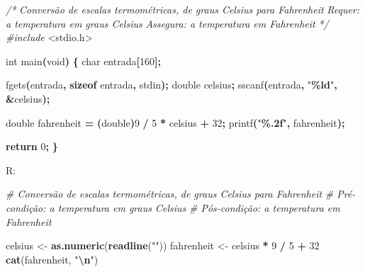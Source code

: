 \documentclass[
  11pt,
  a4paper,
]{scrbook}
\newenvironment{Shaded}{\begin{snugshade}}{\end{snugshade}}
\newcommand{\CommentTok}[1]{\textcolor[rgb]{0.56,0.35,0.01}{\textit{#1}}}
\newcommand{\ControlFlowTok}[1]{\textcolor[rgb]{0.13,0.29,0.53}{\textbf{#1}}}
\newcommand{\DataTypeTok}[1]{\textcolor[rgb]{0.13,0.29,0.53}{#1}}
\newcommand{\DecValTok}[1]{\textcolor[rgb]{0.00,0.00,0.81}{#1}}
\newcommand{\FunctionTok}[1]{\textcolor[rgb]{0.13,0.29,0.53}{\textbf{#1}}}
\newcommand{\ImportTok}[1]{#1}
\newcommand{\KeywordTok}[1]{\textcolor[rgb]{0.13,0.29,0.53}{\textbf{#1}}}
\newcommand{\NormalTok}[1]{#1}
\newcommand{\OperatorTok}[1]{\textcolor[rgb]{0.81,0.36,0.00}{\textbf{#1}}}
\newcommand{\OtherTok}[1]{\textcolor[rgb]{0.56,0.35,0.01}{#1}}
\newcommand{\PreprocessorTok}[1]{\textcolor[rgb]{0.56,0.35,0.01}{\textit{#1}}}
\newcommand{\SpecialCharTok}[1]{\textcolor[rgb]{0.81,0.36,0.00}{\textbf{#1}}}
\newcommand{\StringTok}[1]{\textcolor[rgb]{0.31,0.60,0.02}{#1}}
\begin{document}
\begin{Shaded}
\begin{Highlighting}[]
\CommentTok{/*}
\CommentTok{Conversão de escalas termométricas, de graus Celsius para Fahrenheit}
\CommentTok{Requer: a temperatura em graus Celsius}
\CommentTok{Assegura: a temperatura em Fahrenheit}
\CommentTok{*/}
\PreprocessorTok{\#include }\ImportTok{\textless{}stdio.h\textgreater{}}

\DataTypeTok{int}\NormalTok{ main}\OperatorTok{(}\DataTypeTok{void}\OperatorTok{)} \OperatorTok{\{}
    \DataTypeTok{char}\NormalTok{ entrada}\OperatorTok{[}\DecValTok{160}\OperatorTok{];}

\NormalTok{    fgets}\OperatorTok{(}\NormalTok{entrada}\OperatorTok{,} \KeywordTok{sizeof}\NormalTok{ entrada}\OperatorTok{,}\NormalTok{ stdin}\OperatorTok{);}
    \DataTypeTok{double}\NormalTok{ celsius}\OperatorTok{;}
\NormalTok{    sscanf}\OperatorTok{(}\NormalTok{entrada}\OperatorTok{,} \StringTok{"}\SpecialCharTok{\%ld}\StringTok{"}\OperatorTok{,} \OperatorTok{\&}\NormalTok{celsius}\OperatorTok{);}

    \DataTypeTok{double}\NormalTok{ fahrenheit }\OperatorTok{=} \OperatorTok{(}\DataTypeTok{double}\OperatorTok{)}\DecValTok{9} \OperatorTok{/} \DecValTok{5} \OperatorTok{*}\NormalTok{ celsius }\OperatorTok{+} \DecValTok{32}\OperatorTok{;}
\NormalTok{    printf}\OperatorTok{(}\StringTok{"}\SpecialCharTok{\%.2f}\StringTok{"}\OperatorTok{,}\NormalTok{ fahrenheit}\OperatorTok{);}

    \ControlFlowTok{return} \DecValTok{0}\OperatorTok{;}
\OperatorTok{\}}
\end{Highlighting}
\end{Shaded}

R:

\begin{Shaded}
\begin{Highlighting}[]
\CommentTok{\# Conversão de escalas termométricas, de graus Celsius para Fahrenheit}
\CommentTok{\# Pré{-}condição: a temperatura em graus Celsius}
\CommentTok{\# Pós{-}condição: a temperatura em Fahrenheit}

\NormalTok{celsius }\OtherTok{\textless{}{-}} \FunctionTok{as.numeric}\NormalTok{(}\FunctionTok{readline}\NormalTok{(}\StringTok{""}\NormalTok{))}
\NormalTok{fahrenheit }\OtherTok{\textless{}{-}}\NormalTok{ celsius }\SpecialCharTok{*} \DecValTok{9} \SpecialCharTok{/} \DecValTok{5} \SpecialCharTok{+} \DecValTok{32}
\FunctionTok{cat}\NormalTok{(fahrenheit, }\StringTok{"}\SpecialCharTok{\textbackslash{}n}\StringTok{"}\NormalTok{)}
\end{Highlighting}
\end{Shaded}
\end{document}
